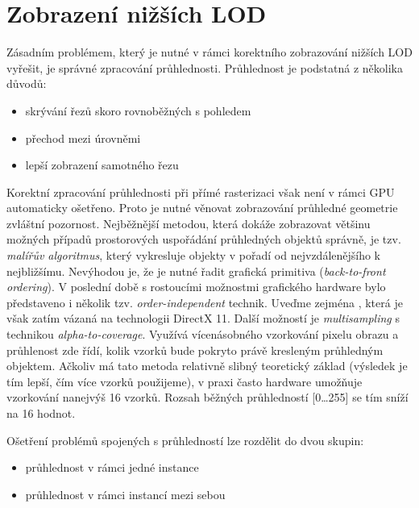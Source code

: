 \section{Zobrazení nižších LOD}
\label{sec-LODdisplay}
Zásadním problémem, který je nutné v rámci korektního zobrazování nižších LOD vyřešit, je správné zpracování průhlednosti. Průhlednost je podstatná z několika důvodů:
\begin{itemize}
\item skrývání řezů skoro rovnoběžných s pohledem
\item přechod mezi úrovněmi
\item lepší zobrazení samotného řezu
\end{itemize}
Korektní zpracování průhlednosti při přímé rasterizaci však není v rámci GPU automaticky ošetřeno. Proto je nutné věnovat zobrazování průhledné geometrie zvláštní pozornost. Nejběžnější metodou, která dokáže zobrazovat většinu možných případů prostorových uspořádání průhledných objektů správně, je tzv. \emph{malířův algoritmus}, který vykresluje objekty v pořadí od nejvzdálenějšího k nejbližšímu. Nevýhodou je, že je nutné řadit grafická primitiva (\emph{back-to-front ordering}). V poslední době s rostoucími možnostmi grafického hardware bylo představeno i několik tzv. \emph{order-independent} %
 technik. Uveďme zejména \cite{order-independent}, která je však zatím vázaná na technologii DirectX 11. Další možností je \emph{multisampling} s technikou \emph{alpha-to-coverage}. Využívá vícenásobného vzorkování pixelu obrazu a průhlenost zde řídí, kolik vzorků bude pokryto právě kresleným průhledným objektem. Ačkoliv má tato metoda relativně slibný teoretický základ (výsledek je tím lepší, čím více vzorků použijeme), v praxi často hardware umožňuje vzorkování nanejvýš 16 vzorků. Rozsah běžných průhledností [0\dots255] se tím sníží na 16 hodnot.

Ošetření problémů spojených s průhledností lze rozdělit do dvou skupin:
\begin{itemize}
\item průhlednost v rámci jedné instance
\item průhlednost v rámci instancí mezi sebou
\end{itemize}

